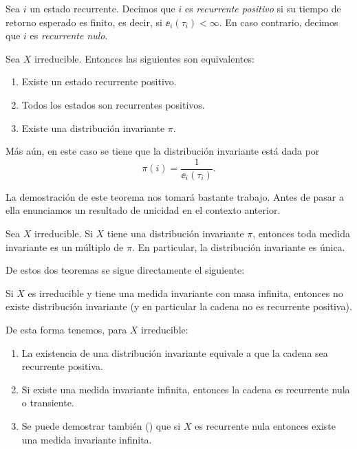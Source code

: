 \begin{defn}
Sea $i$ un estado recurrente.
Decimos que $i$ es \emph{recurrente positivo} si su tiempo de retorno esperado es finito, es decir, si $\ee_i(\tau_i)<\infty$.
En caso contrario, decimos que $i$ es \emph{recurrente nulo}.
\end{defn}

\begin{thm}\label{thm:ex-inv}
Sea $X$ irreducible.
Entonces las siguientes son equivalentes:
\begin{enumerate}[label=\uptext{(\roman*)}]
\item Existe un estado recurrente positivo.
\item Todos los estados son recurrentes positivos.
\item Existe una distribución invariante $\pi$.
\end{enumerate}
Más aún, en este caso se tiene que la distribución invariante está dada por
\[\pi(i)=\frac{1}{\ee_i(\tau_i)}.\]
\end{thm}

La demostración de este teorema nos tomará bastante trabajo.
Antes de pasar a ella enunciamos un resultado de unicidad en el contexto anterior.

\begin{thm}\label{thm:uniq-inv}
Sea $X$ irreducible.
Si $X$ tiene una distribución invariante $\pi$, entonces toda medida invariante es un múltiplo de $\pi$.
En particular, la distribución invariante es única.
\end{thm}

De estos dos teoremas se sigue directamente el siguiente:

\begin{cor}
Si $X$ es irreducible y tiene una medida invariante con masa infinita, entonces no existe distribución invariante (y en particular la cadena no es recurrente positiva).
\end{cor}

De esta forma tenemos, para $X$ irreducible:
\begin{enumerate}[label=\arabic*.]
\item La existencia de una distribución invariante equivale a que la cadena sea recurrente positiva.
\item Si existe una medida invariante infinita, entonces la cadena es recurrente nula o transiente.
\item Se puede demostrar también (\ucmark) que si $X$ es recurrente nula entonces existe una medida invariante infinita.
\end{enumerate}

